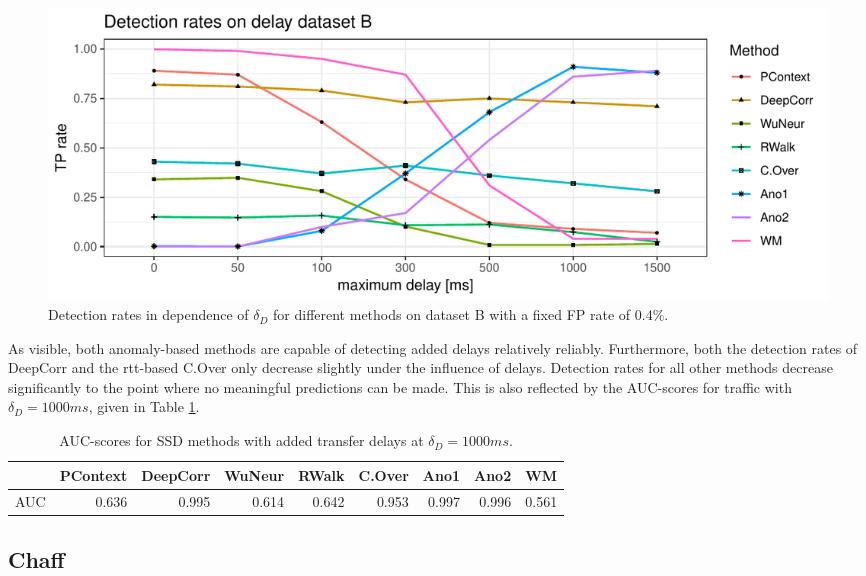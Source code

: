 \documentclass[runningheads]{llncs}\usepackage[]{graphicx}\usepackage[]{color}
\makeatletter
\def\maxwidth{ %
  \ifdim\Gin@nat@width>\linewidth
    \linewidth
  \else
    \Gin@nat@width
  \fi
}
\newenvironment{knitrout}{}{} %
\makeatother
\begin{document}
\begin{knitrout}
\color{fgcolor}\begin{figure}
\includegraphics[width=\maxwidth]{figure/Delaydetection-1} \caption[Detection rates in dependence of $\delta_D$ for different methods on dataset B with a fixed FP rate of $0.4\%$]{Detection rates in dependence of $\delta_D$ for different methods on dataset B with a fixed FP rate of $0.4\%$.}\label{fig:Delaydetection}
\end{figure}


\end{knitrout}

As visible, both anomaly-based methods are capable of detecting added delays relatively reliably. Furthermore, both the detection rates of DeepCorr and the rtt-based C.Over only decrease slightly under the influence of delays. Detection rates for all other methods decrease significantly to the point where no meaningful predictions can be made. This is also reflected by the AUC-scores for traffic with $\delta_D=1000ms$, given in Table \ref{Tab:AUCdelays}.

\begin{table}
\centering
\begin{tabular}{l|r|r|r|r|r|r|r|r}
  \hline
 & PContext & DeepCorr & WuNeur & RWalk & C.Over & Ano1 & Ano2 & WM \\ 
  \hline
AUC & 0.636 & 0.995 & 0.614 & 0.642 & 0.953 & 0.997 & 0.996 & 0.561 \\ 
   \hline
\end{tabular}

\caption{AUC-scores for SSD methods with added transfer delays at $\delta_D=1000ms$.}\label{Tab:AUCdelays}
\end{table}



\subsection{Chaff}
\end{document}

